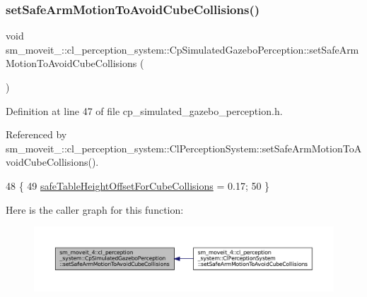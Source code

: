 \subsubsection{\texorpdfstring{set\+Safe\+Arm\+Motion\+To\+Avoid\+Cube\+Collisions()}{setSafeArmMotionToAvoidCubeCollisions()}}
{\footnotesize\ttfamily void sm\+\_\+moveit\+\_\+::cl\+\_\+perception\+\_\+system\+::\+Cp\+Simulated\+Gazebo\+Perception\+::set\+Safe\+Arm\+Motion\+To\+Avoid\+Cube\+Collisions (\begin{DoxyParamCaption}{ }\end{DoxyParamCaption})\hspace{0.3cm}{\ttfamily [inline]}}



Definition at line 47 of file cp\+\_\+simulated\+\_\+gazebo\+\_\+perception.\+h.



Referenced by sm\+\_\+moveit\+\_\+::cl\+\_\+perception\+\_\+system\+::\+Cl\+Perception\+System\+::set\+Safe\+Arm\+Motion\+To\+Avoid\+Cube\+Collisions().


\begin{DoxyCode}
48             \{
49                  \hyperlink{classsm__moveit__4_1_1cl__perception__system_1_1CpSimulatedGazeboPerception_a6b6bafbddde1f72c81bf54aa75872151}{safeTableHeightOffsetForCubeCollisions} = 0.17;
50             \}
\end{DoxyCode}
Here is the caller graph for this function\+:
\nopagebreak
\begin{figure}[H]
\begin{center}
\leavevmode
\includegraphics[width=350pt]{classsm__moveit__4_1_1cl__perception__system_1_1CpSimulatedGazeboPerception_af42b5a4e239fcac98a222c34115c9bc0_icgraph}
\end{center}
\end{figure}
\mbox{\label{classsm__moveit__4_1_1cl__perception__system_1_1CpSimulatedGazeboPerception_a7914ffd20518c866a8a1e11254589d12}} 
